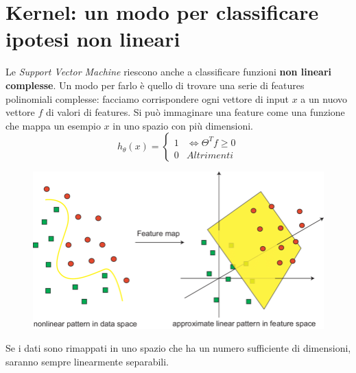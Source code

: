 \section{Kernel: un modo per classificare ipotesi non lineari}
Le \textit{Support Vector Machine} riescono anche a classificare funzioni \textbf{non lineari complesse}. Un modo per farlo è quello di trovare una serie di features polinomiali complesse: facciamo corrispondere ogni vettore di input $x$ a un nuovo vettore $f$ di valori di features. Si può immaginare una feature come una funzione che mappa un esempio $x$ in uno spazio con più dimensioni.
  \[h_\theta(x) =
    \begin{cases}
      1& \iff \Theta^Tf \geq 0 \\
      0& Altrimenti
    \end{cases}
  \]
\begin{figure}[H]
    \centering
    \includegraphics[width=1\textwidth]{img/linear_nonLinear.png}
\end{figure}
\begin{definizione}
  Se i dati sono rimappati in uno spazio che ha un numero sufficiente di dimensioni, saranno sempre linearmente separabili.
\end{definizione}
